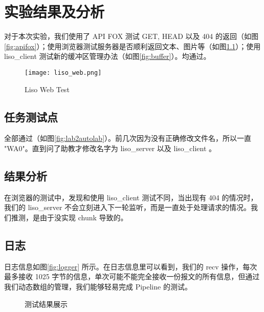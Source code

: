 

\chapter{实验结果及分析}
对于本次实验，我们使用了 API FOX 测试 GET, HEAD 以及 404 的返回（如图\ref{fig:apifox}）；使用浏览器测试服务器是否顺利返回文本、图片等（如图\ref{fig:web}）；使用liso\_client 测试新的缓冲区管理办法（如图\ref{fig:buffer}）。均通过。

\begin{figure}[htbp!]
    \centering
    \texttt{[image: liso\_web.png]}
    \caption{Liso Web Test}\label{fig:web}
\end{figure}

\section{任务测试点}
全部通过（如图\ref{fig:lab2autolab}）。前几次因为没有正确修改文件名，所以一直 "WA0"。直到问了助教才修改名字为 liso\_server 以及 liso\_client 。
\section{结果分析}
在浏览器的测试中，发现和使用 liso\_client 测试不同，当出现有 404 的情况时，我们的 liso\_server 不会立刻进入下一轮监听，而是一直处于处理请求的情况。我们推测，是由于没实现 chunk 导致的。

\section{日志}
日志信息如图\ref{fig:logger} 所示。在日志信息里可以看到，我们的 recv 操作，每次最多接收 1025 字节的信息，单次可能不能完全接收一份报文的所有信息，但通过我们动态数组的管理，我们能够轻易完成 Pipeline 的测试。

\begin{figure}[htbp!]
    \centering

    \caption{测试结果展示}\label{fig:result}
\end{figure}

